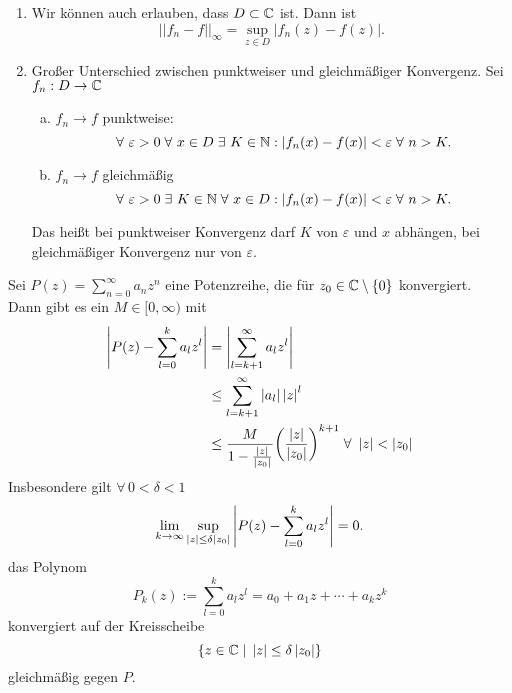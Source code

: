 \documentclass[../ana1.tex]{subfiles}
\begin{document}
\begin{bem} \leavevmode
    \begin{enumerate}
        \item Wir können auch erlauben, dass \(D \subset \mathbb{C} \) 
        ist. Dann ist 
        \[ ||f_n-f||_\infty = \underset{z \in D}{\sup}|f_n(z) 
        - f(z)|. \]
        \item Großer Unterschied zwischen punktweiser und 
        gleichmäßiger Konvergenz. Sei \( f_n : D \rightarrow \mathbb{C} \) 
        \begin{enumerate}[(a)]
            \item \( f_n \rightarrow f \) punktweise: 
            \[ \forall \, \varepsilon > 0 \; \forall \, x \in 
            D \; \exists \, K \in \N: \abs{ f_n(x) - f(x) } 
            < \varepsilon \; \forall \, n > K. \]
            \item \( f_n \rightarrow f \) gleichmäßig
            \[ \forall \, \varepsilon > 0 \; \exists \, K \in \N 
            \;\forall \, x \in D: \abs{ f_n(x) - f(x) } < \varepsilon 
            \;\forall \, n > K. \]
        \end{enumerate}
        Das heißt bei punktweiser Konvergenz darf \( K \) von 
        \( \varepsilon \) und \( x \) abhängen, bei gleichmäßiger 
        Konvergenz nur von \( \varepsilon \).
    \end{enumerate}
\end{bem}
\begin{lem}\label{satz:glmKonvPotenz}
    Sei \( P(z) = \sum_{n=0}^\infty a_n z^n \) eine Potenzreihe, 
    die für \( z_0 \in \mathbb{C} \setminus \{0\} \) konvergiert. \\
    Dann gibt es ein \( M \in [0,\infty) \) mit 
    \begin{align*}
        \abs{ P(z) - \sum_{l=0}^k a_l z^l } 
        &= \abs{ \sum_{l=k+1}^\infty a_l z^l }\\
        &\leq \sum_{l=k+1}^\infty \abs{ a_l } \abs{ z }^l \\
        &\leq \frac{ M }{ 1 - \frac{\abs{z}}{\abs{z_0}} } 
        {\left( \frac{\abs{z}}{\abs{z_0}} \right)}^{k+1} 
        \; \forall \, \abs{z} < \abs{z_0}
    \end{align*}
    Insbesondere gilt \( \forall \, 0 < \delta < 1 \)
    \[ \lim\limits_{k\rightarrow\infty} \underset{\left|z\right| \leq \delta \left|z_0\right|}{\sup} 
    \left| P(z) - \sum_{l=0}^k a_l z^l \right| = 0. \]
    \Dphp{} das Polynom 
    \[ P_k(z) := \sum_{l=0}^k a_l z^l 
    = a_0 + a_1 z + \cdots + a_k z^k \]
    konvergiert auf der Kreisscheibe 
    \[ \{ z \in \mathbb{C} \;\vert \; \left|z\right| \leq 
    \delta \left|z_0\right| \} \]
    gleichmäßig gegen \( P \).
\end{lem}
\end{document}
